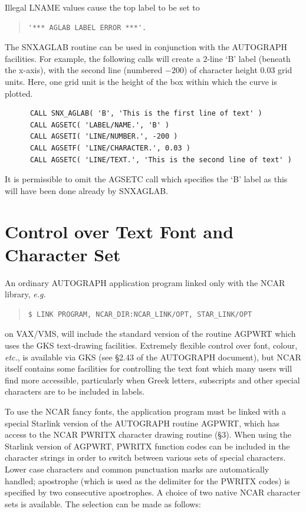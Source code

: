 \documentclass[twoside,11pt]{article}
\renewcommand{\_}{\texttt{\symbol{95}}}
\begin{document}
Illegal LNAME values cause the top label to be set to

\begin {quote}
\begin{verbatim}
'*** AGLAB LABEL ERROR ***'.
\end{verbatim}
\end {quote}

The SNX\_AGLAB routine can be used in conjunction with the AUTOGRAPH facilities.
For example, the following calls will create a 2-line `B' label (beneath the
x-axis), with the second line (numbered $-200$) of character height 0.03 grid
units.
Here, one grid unit is the height of the box within which the curve is
plotted.

\begin{verbatim}
      CALL SNX_AGLAB( 'B', 'This is the first line of text' )
      CALL AGSETC( 'LABEL/NAME.', 'B' )
      CALL AGSETI( 'LINE/NUMBER.', -200 )
      CALL AGSETF( 'LINE/CHARACTER.', 0.03 )
      CALL AGSETC( 'LINE/TEXT.', 'This is the second line of text' )
\end{verbatim}

It is permissible to omit the AGSETC call which specifies the `B' label as
this will have been done already by SNX\_AGLAB.


\section {Control over Text Font and Character Set} \label{text_sect}

An ordinary AUTOGRAPH application program linked only with the NCAR library,
{\em e.g.}

\begin {quote}
\begin{verbatim}
$ LINK PROGRAM, NCAR_DIR:NCAR_LINK/OPT, STAR_LINK/OPT
\end{verbatim}
\end {quote}

on VAX/VMS,
will include the standard version of the routine AGPWRT which uses the GKS
text-drawing facilities.
Extremely flexible control over font, colour, {\em etc.}, is available via GKS
(see \S 2.43 of the AUTOGRAPH document), but NCAR itself contains
some facilities for controlling the text font which many users will find more
accessible, particularly when Greek letters, subscripts and other special
characters are to be included in labels.

To use the NCAR fancy fonts, the application program must be linked with a
special Starlink version of the AUTOGRAPH routine AGPWRT, which has access to
the NCAR PWRITX character drawing routine (\S 3).
When using the Starlink version of AGPWRT, PWRITX function codes can be
included in the character strings in order to switch between various sets of
special characters.
Lower case characters and common punctuation marks are automatically handled;
apostrophe (which is used as the delimiter for the PWRITX codes) is specified
by two consecutive apostrophes.
A choice of two native NCAR character sets is available.
The selection can be made as follows:
\end{document}
